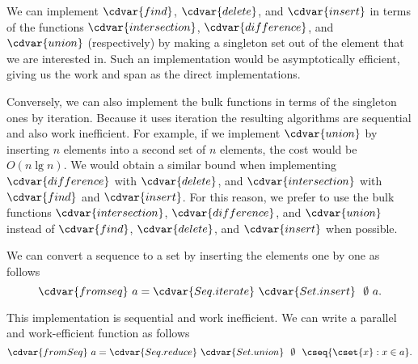 \begin{gram}
We can implement $\cdvar{find}$, $\cdvar{delete}$, and $\cdvar{insert}$ in terms of
the functions $\cdvar{intersection}$, $\cdvar{difference}$, and $\cdvar{union}$
(respectively) by making a singleton set out of the element that we
are interested in.
%
Such an implementation would be asymptotically efficient, giving us
the work and span as the direct implementations.
%

Conversely, we can also implement the bulk functions in terms of the
singleton ones by iteration.
%
Because it uses iteration the resulting algorithms are
sequential and also work inefficient.
%
For example, if we implement $\cdvar{union}$ by inserting
$n$ elements into a second set of $n$ elements, the cost would be $O(n
\lg n)$.  
%
We would obtain a similar bound when implementing
$\cdvar{difference}$ with $\cdvar{delete}$, and $\cdvar{intersection}$ with
$\cdvar{find}$ and $\cdvar{insert}$.
%
For this reason, we prefer to use the bulk functions $\cdvar{intersection}$, $\cdvar{difference}$, and $\cdvar{union}$ instead
of $\cdvar{find}$, $\cdvar{delete}$, and $\cdvar{insert}$ when possible.
\end{gram}


\begin{example}
\label{XXex:st::fromseq-imp}
We can  convert a sequence to a set by inserting the elements
one by one as follows
\[
\cdvar{fromseq}~a = \cdvar{Seq.iterate}~\cdvar{Set.insert}~~\emptyset~a.
\]

This implementation is sequential and work inefficient. 
%
We can write a parallel and work-efficient function as follows
\[
\cdvar{fromSeq}~a = \cdvar{Seq.reduce}~\cdvar{Set.union}~~\emptyset~~\cseq{\cset{x} : x \in a}.
\]

\end{example}


